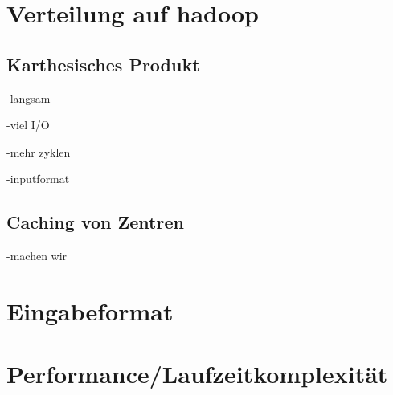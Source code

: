 \documentclass[a4paper,12pt]{article}
\begin{document}
\section{Verteilung auf hadoop}
\subsection{Karthesisches Produkt}
-langsam

-viel I/O

-mehr zyklen

-inputformat

\subsection{Caching von Zentren}
-machen wir

\section{Eingabeformat}

\section{Performance/Laufzeitkomplexität}
\end{document}
